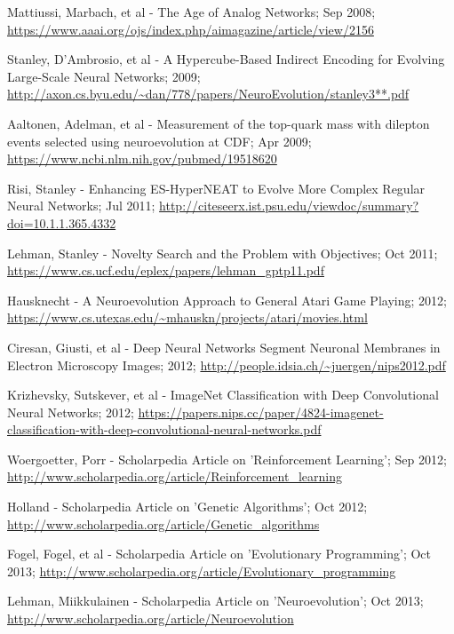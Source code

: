 \documentclass[journal, a4paper]{IEEEtran}
\begin{document}
\begin{thebibliography}{5}
    Mattiussi, Marbach, et al - The Age of Analog Networks; Sep 2008;
    \url{https://www.aaai.org/ojs/index.php/aimagazine/article/view/2156}

    Stanley, D’Ambrosio, et al - A Hypercube-Based Indirect Encoding for Evolving Large-Scale Neural Networks; 2009;
    \url{http://axon.cs.byu.edu/~dan/778/papers/NeuroEvolution/stanley3**.pdf}

    Aaltonen, Adelman, et al - Measurement of the top-quark mass with dilepton events selected using neuroevolution at CDF; Apr 2009;
    \url{https://www.ncbi.nlm.nih.gov/pubmed/19518620}

    Risi, Stanley - Enhancing ES-HyperNEAT to Evolve More Complex Regular Neural Networks; Jul 2011;
    \url{http://citeseerx.ist.psu.edu/viewdoc/summary?doi=10.1.1.365.4332}

    Lehman, Stanley - Novelty Search and the Problem with Objectives; Oct 2011;
    \url{https://www.cs.ucf.edu/eplex/papers/lehman_gptp11.pdf}

    Hausknecht - A Neuroevolution Approach to General Atari Game Playing; 2012;
    \url{https://www.cs.utexas.edu/~mhauskn/projects/atari/movies.html}

    Ciresan, Giusti, et al - Deep Neural Networks Segment Neuronal Membranes in Electron Microscopy Images; 2012;
    \url{http://people.idsia.ch/~juergen/nips2012.pdf}

    Krizhevsky, Sutskever, et al - ImageNet Classification with Deep Convolutional Neural Networks; 2012;
    \url{https://papers.nips.cc/paper/4824-imagenet-classification-with-deep-convolutional-neural-networks.pdf}

    Woergoetter, Porr - Scholarpedia Article on 'Reinforcement Learning'; Sep 2012;
    \url{http://www.scholarpedia.org/article/Reinforcement_learning}

    Holland - Scholarpedia Article on 'Genetic Algorithms'; Oct 2012;
    \url{http://www.scholarpedia.org/article/Genetic_algorithms}

    Fogel, Fogel, et al - Scholarpedia Article on 'Evolutionary Programming'; Oct 2013;
    \url{http://www.scholarpedia.org/article/Evolutionary_programming}

    Lehman, Miikkulainen - Scholarpedia Article on 'Neuroevolution'; Oct 2013;
    \url{http://www.scholarpedia.org/article/Neuroevolution}


\end{thebibliography}
\end{document}
